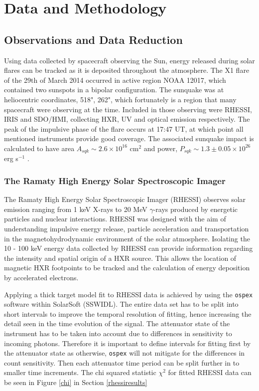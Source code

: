 \section{Data and Methodology}
\subsection{Observations and Data Reduction}
Using data collected by spacecraft observing the Sun, energy released during solar flares can be tracked as it is deposited throughout the atmosphere. The X1 flare of the 29th of March 2014 occurred in active region NOAA 12017, which contained two sunspots in a bipolar configuration. The sunquake was at heliocentric coordinates, 518", 262", which fortunately is a region that many spacecraft were observing at the time. Included in those observing were RHESSI, IRIS and SDO/HMI, collecting HXR, UV and optical emission respectively. The peak of the impulsive phase of the flare occurs at 17:47 UT, at which point all mentioned instruments provide good coverage. The associated sunquake impact is calculated to have area $A_{sqk} \sim 2.6{\times}10^{16}$ cm$^{2}$ and power, $P_{sqk} \sim 1.3\pm0.05{\times}10^{26}$ erg s$^{-1}$ \citep{2014ApJ...796...85J}.

\subsubsection{The Ramaty High Energy Solar Spectroscopic Imager}\label{rhessi}
The Ramaty High Energy Solar Spectroscopic Imager (RHESSI) observes solar emission ranging from 1 keV X-rays to 20 MeV $\gamma$-rays produced by energetic particles and nuclear interactions. RHESSI was designed with the aim of understanding impulsive energy release, particle acceleration and transportation in the magnetohydrodynamic environment of the solar atmosphere. Isolating the 10 - 100 keV energy data collected by RHESSI can provide information regarding the intensity and spatial origin of a HXR source. This allows the location of magnetic HXR footpoints to be tracked and the calculation of energy deposition by accelerated electrons. 
  
Applying a thick target model fit to RHESSI data is achieved by using the \texttt{ospex} software within SolarSoft (SSWIDL). The entire data set has to be split into short intervals to improve the temporal resolution of fitting, hence increasing the detail seen in the time evolution of the signal. The attenuator state of the instrument has to be taken into account due to differences in sensitivity to incoming photons. Therefore it is important to define intervals for fitting first by the attenuator state as otherwise, \texttt{ospex} will not mitigate for the differences in count sensitivity. Then each attenuator time period can be split further in to smaller time increments. The chi squared statistic $\chi^{2}$ for fitted RHESSI data can be seen in Figure \ref{chi} in Section \ref{rhessiresults}

